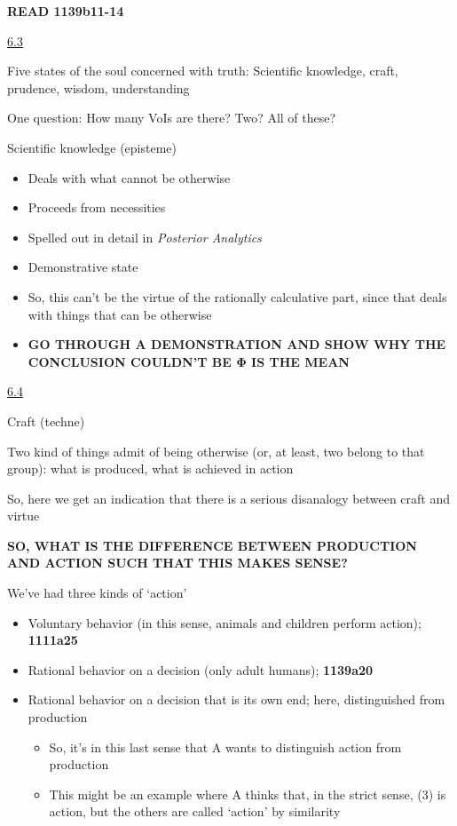 \documentclass[11pt]{article}
\begin{document}
\noindent\textbf{READ 1139b11-14}
\vspace*{2mm}

\noindent\underline{6.3}
\vspace*{4mm}

\noindent Five states of the soul concerned with truth: Scientific knowledge, craft, prudence, wisdom, understanding
\vspace*{2mm}

\noindent One question: How many VoIs are there? Two? All of these?
\vspace*{2mm}

\noindent Scientific knowledge (episteme)
\vspace*{2mm}

\begin{itemize}\item{Deals with what cannot be otherwise}\item{Proceeds from necessities}\item{Spelled out in detail in \emph{Posterior Analytics}}\item{Demonstrative state}\item{So, this can't be the virtue of the rationally calculative part, since that deals with things that can be otherwise}\item{\textbf{GO THROUGH A DEMONSTRATION AND SHOW WHY THE CONCLUSION COULDN'T BE Φ IS THE MEAN}}\end{itemize}

\noindent\underline{6.4}
\vspace*{4mm}

\noindent Craft (techne)

\noindent Two kind of things admit of being otherwise (or, at least, two belong to that group): what is produced, what is achieved in action
\vspace*{2mm}

\noindent So, here we get an indication that there is a serious disanalogy between craft and virtue
\vspace*{2mm}

\noindent\textbf{SO, WHAT IS THE DIFFERENCE BETWEEN PRODUCTION AND ACTION SUCH THAT THIS MAKES SENSE?}
\vspace*{2mm}

\noindent We've had three kinds of `action'

\begin{itemize}\item{Voluntary behavior (in this sense, animals and children perform action); \textbf{1111a25}}\item{Rational behavior on a decision (only adult humans); \textbf{1139a20}}\item{Rational behavior on a decision that is its own end; here, distinguished from production}\begin{itemize}\item{So, it's in this last sense that A wants to distinguish action from production}\item{This might be an example where A thinks that, in the strict sense, (3) is action, but the others are called `action' by similarity}\end{itemize}\end{itemize}
\end{document}
